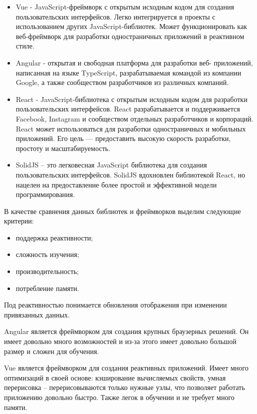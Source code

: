 \begin{itemize}
	\item Vue - JavaScript-фреймворк с открытым исходным кодом для
	      создания пользовательских интерфейсов. Легко интегрируется в проекты с
	      использованием других JavaScript-библиотек. Может функционировать как
	      веб-фреймворк для разработки одностраничных приложений в реактивном
	      стиле.
	\item Angular - открытая и свободная платформа для разработки веб-
	      приложений, написанная на языке TypeScript, разрабатываемая командой из
	      компании Google, а также сообществом разработчиков из различных
	      компаний.
	\item React - JavaScript-библиотека с открытым исходным кодом для
	      разработки пользовательских интерфейсов. React разрабатывается и
	      поддерживается Facebook, Instagram и сообществом отдельных разработчиков
	      и корпораций. React может использоваться для разработки одностраничных и
	      мобильных приложений. Его цель — предоставить высокую скорость
	      разработки, простоту и масштабируемость.
	\item SolidJS – это легковесная JavaScript библиотека для создания
	      пользовательских интерфейсов. SolidJS вдохновлен библиотекой React, но
	      нацелен на предоставление более простой и эффективной модели
	      программирования.
\end{itemize}

В качестве сравнения данных библиотек и фреймворков выделим
следующие критерии:
\begin{itemize}
	\item поддержка реактивности;
	\item сложность изучения;
	\item производительность;
	\item потребление памяти.
\end{itemize}

Под реактивностью понимается обновления отображения при
изменении привязанных данных.

Angular является фреймворком для создания крупных браузерных
решений. Он имеет довольно много возможностей и из-за этого имеет
довольно большой размер и сложен для обучения.

Vue является фреймворком для создания реактивных приложений.
Имеет много оптимизаций в своей основе: кэширование вычисляемых
свойств, умная перерисовка – перерисовываются только нужные узлы, что
позволяет работать приложению довольно быстро. Также легок в обучении и
не требует много памяти.

